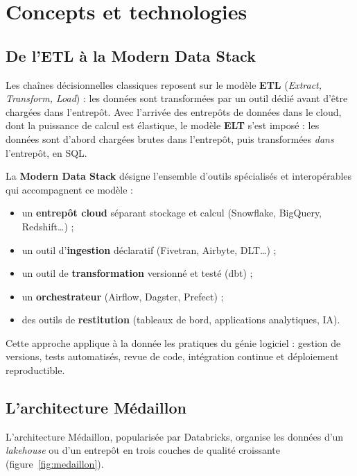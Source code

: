 \chapter{Concepts et technologies}
\label{ch:etatart}

\section{De l'ETL à la Modern Data Stack}

Les chaînes décisionnelles classiques reposent sur le modèle \textbf{ETL} (\emph{Extract, Transform,
Load}) : les données sont transformées par un outil dédié avant d'être chargées dans l'entrepôt. Avec
l'arrivée des entrepôts de données dans le cloud, dont la puissance de calcul est élastique, le modèle
\textbf{ELT} s'est imposé : les données sont d'abord chargées brutes dans l'entrepôt, puis transformées
\emph{dans} l'entrepôt, en SQL.

La \textbf{Modern Data Stack} désigne l'ensemble d'outils spécialisés et interopérables qui
accompagnent ce modèle :
\begin{itemize}
  \item un \textbf{entrepôt cloud} séparant stockage et calcul (Snowflake, BigQuery, Redshift\ldots) ;
  \item un outil d'\textbf{ingestion} déclaratif (Fivetran, Airbyte, DLT\ldots) ;
  \item un outil de \textbf{transformation} versionné et testé (dbt) ;
  \item un \textbf{orchestrateur} (Airflow, Dagster, Prefect) ;
  \item des outils de \textbf{restitution} (tableaux de bord, applications analytiques, IA).
\end{itemize}

Cette approche applique à la donnée les pratiques du génie logiciel : gestion de versions, tests
automatisés, revue de code, intégration continue et déploiement reproductible.

\section{L'architecture Médaillon}

L'architecture Médaillon, popularisée par Databricks, organise les données d'un \emph{lakehouse} ou d'un
entrepôt en trois couches de qualité croissante (figure~\ref{fig:medaillon}).

